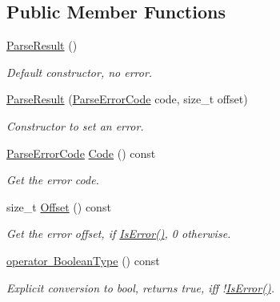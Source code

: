 \subsection*{Public Member Functions}
\begin{DoxyCompactItemize}
\item 
\mbox{\hyperlink{structrapidjson_1_1_parse_result_a0f03679d5fa2736d9e351541e767fac1}{Parse\+Result}} ()
\begin{DoxyCompactList}\small\item\em Default constructor, no error. \end{DoxyCompactList}\item 
\mbox{\hyperlink{structrapidjson_1_1_parse_result_ad15710045513f13ba526753c4a2cb59b}{Parse\+Result}} (\mbox{\hyperlink{group___r_a_p_i_d_j_s_o_n___e_r_r_o_r_s_ga7d3acf640886b1f2552dc8c4cd6dea60}{Parse\+Error\+Code}} code, size\+\_\+t offset)
\begin{DoxyCompactList}\small\item\em Constructor to set an error. \end{DoxyCompactList}\item 
\mbox{\hyperlink{group___r_a_p_i_d_j_s_o_n___e_r_r_o_r_s_ga7d3acf640886b1f2552dc8c4cd6dea60}{Parse\+Error\+Code}} \mbox{\hyperlink{structrapidjson_1_1_parse_result_a3c6a1f7b7dc21363a255eb10a3c0e00e}{Code}} () const
\begin{DoxyCompactList}\small\item\em Get the error code. \end{DoxyCompactList}\item 
size\+\_\+t \mbox{\hyperlink{structrapidjson_1_1_parse_result_a85036788b0cfd1c676900de6f8260bd6}{Offset}} () const
\begin{DoxyCompactList}\small\item\em Get the error offset, if \mbox{\hyperlink{structrapidjson_1_1_parse_result_ab6d87c6ce9c849f35e902fbe23f485c4}{Is\+Error()}}, 0 otherwise. \end{DoxyCompactList}\item 
\mbox{\hyperlink{structrapidjson_1_1_parse_result_af0936ace1dc9b674e9afb75ec6145b32}{operator Boolean\+Type}} () const
\begin{DoxyCompactList}\small\item\em Explicit conversion to {\ttfamily bool}, returns {\ttfamily true}, iff !\mbox{\hyperlink{structrapidjson_1_1_parse_result_ab6d87c6ce9c849f35e902fbe23f485c4}{Is\+Error()}}. \end{DoxyCompactList}\item 

\end{DoxyCompactItemize}
